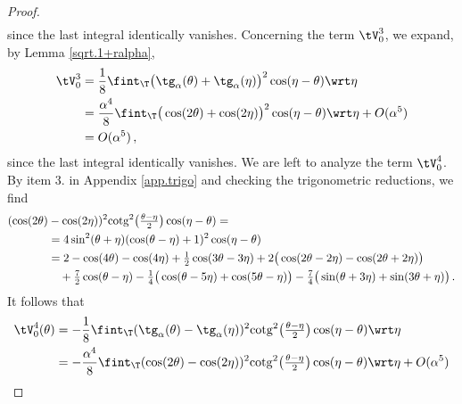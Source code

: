 \documentclass[a4paper,reqno,10pt]{article}
\begin{document}
\begin{proof}
\begin{align}
	 	\end{align}
since the last integral identically vanishes.
	Concerning the term $\tV_{0}^{3}$, we expand,  by Lemma \ref{sqrt.1+ralpha},
	 	\begin{align}
	 		\tV_{0}^{3}& = \frac{1}{8} \fint_{\T} \big( \tg_{\alpha}(\theta) + \tg_{\alpha}(\eta) \big)^2 \cos(\eta-\theta) \wrt\eta \\
	 		& =  \frac{\alpha^4}{8} \fint_{\T} \big( \cos(2\theta) + \cos(2\eta) \big)^2 \cos(\eta-\theta) \wrt\eta + O(\alpha^5) \\
           & = O(\alpha^5) \,,
	 	\end{align}
since the last integral identically vanishes.
	 We are left to analyze the term $\tV_{0}^{4}$. By item $3.$ in Appendix \ref{app.trigo} and checking the trigonometric reductions, we find
	 	\begin{align}
	 			(	\cos(2\theta)&-\cos(2\eta))^2  {\rm cotg}^2\big(\tfrac{\theta-\eta}{2}\big) \cos(\eta-\theta)  =\\
	 		& = 4\sin^2(\theta+\eta)(\cos(\theta-\eta)+1)^2 \cos(\eta-\theta) \\
	 		& = 2- \cos(4\theta) -\cos(4\eta)+ \tfrac12 \cos(3\theta-3\eta) + 2\big( \cos(2\theta-2\eta) - \cos(2\theta+2\eta)  \big) \\
	 		& \quad + \tfrac72 \cos(\theta-\eta) -\tfrac14 \big( \cos(\theta-5\eta) + \cos(5\theta-\eta) \big) - \tfrac74 \big( \sin(\theta+3\eta)+\sin(3\theta+\eta)\big) \,.
	 	\end{align}
	 It follows that
	 	\begin{align}
	 		\tV_{0}^{4}(\theta)& = - \frac{1}{8}  \fint_{\T}  (\tg_{\alpha}(\theta)-\tg_{\alpha}(\eta))^2 {\rm cotg}^2\big(\tfrac{\theta-\eta}{2}\big)  \cos(\eta-\theta) \wrt\eta \\
	 		& = - \frac{\alpha^4}{8} \fint_{\T}  (\cos(2\theta)-\cos(2\eta))^2 {\rm cotg}^2\big(\tfrac{\theta-\eta}{2}\big)  \cos(\eta-\theta) \wrt\eta + O(\alpha^5)\\

\end{align}
\end{proof}
\end{document}
